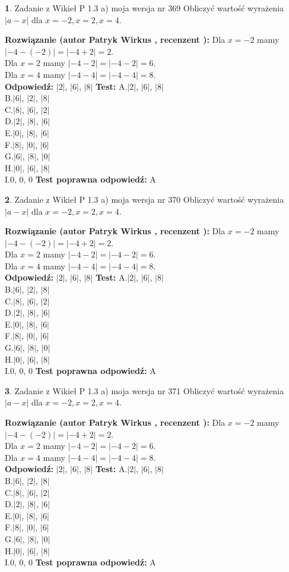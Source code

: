 \documentclass[12pt, a4paper]{article}
\theoremstyle{definition} %
\newtheorem{zad}{}
\newcommand{\zadStart}[1]{\begin{zad}#1\newline}
\newcommand{\zadStop}{\end{zad}}
\newcommand{\rozwStart}[2]{\noindent \textbf{Rozwiązanie (autor #1 , recenzent #2): }\newline}
\newcommand{\rozwStop}{\newline}
\newcommand{\odpStart}{\noindent \textbf{Odpowiedź:}\newline}
\newcommand{\odpStop}{\newline}
\newcommand{\testStart}{\noindent \textbf{Test:}\newline}
\newcommand{\testStop}{\newline}
\newcommand{\kluczStart}{\noindent \textbf{Test poprawna odpowiedź:}\newline}
\newcommand{\kluczStop}{\newline}
\begin{document}
\zadStart{Zadanie z Wikieł P 1.3 a) moja wersja nr 369}
Obliczyć wartość wyrażenia $|a - x|$ dla $x=-2,x=2,x=4$.
\zadStop
\rozwStart{Patryk Wirkus}{}
Dla $x = -2$ mamy $|-4 - (-2)| = |-4 + 2| = 2$.\\
Dla $x = 2$ mamy $|-4 - 2| = |-4 - 2| = 6$.\\
Dla $x = 4$ mamy $|-4 - 4| = |-4 - 4| = 8$.\\
\rozwStop
\odpStart
$|2|$, $|6|$, $|8|$
\odpStop
\testStart
A.$|2|$, $|6|$, $|8|$\\
B.$|6|$, $|2|$, $|8|$\\
C.$|8|$, $|6|$, $|2|$\\
D.$|2|$, $|8|$, $|6|$\\
E.$|0|$, $|8|$, $|6|$\\
F.$|8|$, $|0|$, $|6|$\\
G.$|6|$, $|8|$, $|0|$\\
H.$|0|$, $|6|$, $|8|$\\
I.$0$, $0$, $0$
\testStop
\kluczStart
A
\kluczStop



\zadStart{Zadanie z Wikieł P 1.3 a) moja wersja nr 370}
Obliczyć wartość wyrażenia $|a - x|$ dla $x=-2,x=2,x=4$.
\zadStop
\rozwStart{Patryk Wirkus}{}
Dla $x = -2$ mamy $|-4 - (-2)| = |-4 + 2| = 2$.\\
Dla $x = 2$ mamy $|-4 - 2| = |-4 - 2| = 6$.\\
Dla $x = 4$ mamy $|-4 - 4| = |-4 - 4| = 8$.\\
\rozwStop
\odpStart
$|2|$, $|6|$, $|8|$
\odpStop
\testStart
A.$|2|$, $|6|$, $|8|$\\
B.$|6|$, $|2|$, $|8|$\\
C.$|8|$, $|6|$, $|2|$\\
D.$|2|$, $|8|$, $|6|$\\
E.$|0|$, $|8|$, $|6|$\\
F.$|8|$, $|0|$, $|6|$\\
G.$|6|$, $|8|$, $|0|$\\
H.$|0|$, $|6|$, $|8|$\\
I.$0$, $0$, $0$
\testStop
\kluczStart
A
\kluczStop



\zadStart{Zadanie z Wikieł P 1.3 a) moja wersja nr 371}
Obliczyć wartość wyrażenia $|a - x|$ dla $x=-2,x=2,x=4$.
\zadStop
\rozwStart{Patryk Wirkus}{}
Dla $x = -2$ mamy $|-4 - (-2)| = |-4 + 2| = 2$.\\
Dla $x = 2$ mamy $|-4 - 2| = |-4 - 2| = 6$.\\
Dla $x = 4$ mamy $|-4 - 4| = |-4 - 4| = 8$.\\
\rozwStop
\odpStart
$|2|$, $|6|$, $|8|$
\odpStop
\testStart
A.$|2|$, $|6|$, $|8|$\\
B.$|6|$, $|2|$, $|8|$\\
C.$|8|$, $|6|$, $|2|$\\
D.$|2|$, $|8|$, $|6|$\\
E.$|0|$, $|8|$, $|6|$\\
F.$|8|$, $|0|$, $|6|$\\
G.$|6|$, $|8|$, $|0|$\\
H.$|0|$, $|6|$, $|8|$\\
I.$0$, $0$, $0$
\testStop
\kluczStart
A
\kluczStop
\end{document}
